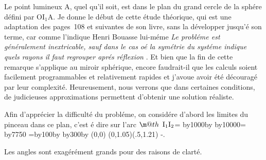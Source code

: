 \documentclass[fontsize=11pt,english,BCOR=10mm,DIV=12,bibliography=totoc,parskip=false,headings=small,
    headinclude=false,footinclude=false,oneside]{pst-doc}
\makeatletter
\def\ARC#1{\setbox0\hbox{$\m@th\displaystyle#1$}\kslant=\ht0
   \divide\kslant by1000\multiply\kslant by\fontdimen1\textfont1
   \divide\kslant by10000\kslantd=\kslant\fontdimen6\textfont1
      \divide\kslantd by7750\kern\kslantd
   \r@ppord=\wd0\multiply\r@ppord by100\divide\r@ppord by\ht0
   \multiply\r@ppord by300\advance\r@ppord by\ht0
   \pspicture(0,0)
   \psparabola[linewidth=.3pt](0,1.05\ht0)(.5\wd0,1.21\r@ppord)
   \endpspicture\kern-\kslantd\box0}
\makeatother
\begin{document}
Le point lumineux A, quel qu'il soit, est dans le plan du grand
cercle de la sphére défini par $\mathrm{OI_1A}$. Je donne le début
de cette étude théorique, qui est une adaptation des pages~108 et suivantes de son livre,
sans la développer jusqu'é son terme, car
comme l'indique Henri Bouasse lui-méme \guillemotleft \textit{ Le
probléme est généralement inextricable, sauf dans le cas oé la
symétrie du systéme indique quels rayons il faut regrouper aprés
réflexion} \guillemotright. Et bien que la fin de cette remarque
s'applique au miroir sphérique, encore faudrait-il que les calculs
soient facilement programmables et relativement rapides et j'avoue
avoir été découragé par leur complexité. Heureusement, nous
verrons que dans certaines conditions, de judicieuses
approximations permettent d'obtenir une solution réaliste.

Afin d'apprécier la difficulté du probléme, on considére d'abord les limites du pinceau 
dans ce plan, c'est é dire sur l'arc  \ARC{\mathrm{\hspace{0.5em}I_1I_2}}.

Les angles sont exagérément grands
pour des raisons de clarté.
\end{document}
